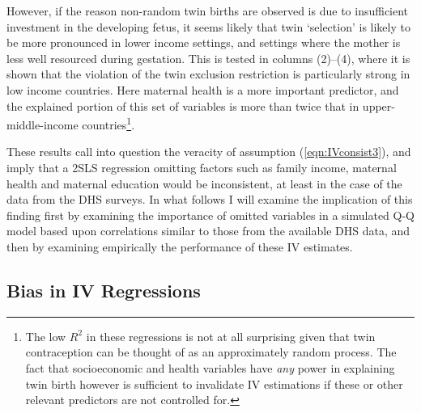 \documentclass{article}[11pt,subeqn]
\begin{document}
\begin{spacing}{1.5}
However, if the reason non-random twin births are observed is due to insufficient investment in the developing fetus, it seems likely that
 twin `selection' is likely to be more pronounced in lower income settings, and settings where the mother is less well resourced during gestation.  
This is tested in columns (2)--(4), where it is shown that the violation of the twin exclusion restriction is particularly
strong in low income countries.  Here maternal health is a more important predictor, and the explained portion of this set of variables is more than
twice that in upper-middle-income countries\footnote{The low $R^2$ in these regressions is not at all surprising given that twin contraception
can be thought of as an approximately random process.  The fact that socioeconomic and health variables have \emph{any} power in explaining
twin birth however is sufficient to invalidate IV estimations if these or other relevant predictors are not controlled for.}.

These results call into question the veracity of assumption (\ref{eqn:IVconsist3}), and imply that a 2SLS regression omitting factors such as family
income, maternal health and maternal education would be inconsistent, at least in the case of the data from the DHS surveys.  In what follows
I will examine the implication of this finding first by examining the importance of omitted variables in a simulated Q-Q model based upon
correlations similar to those from the available DHS data, and then by examining empirically the performance of these IV estimates.  
\subsection{Bias in IV Regressions}
\label{scn:bias}

\end{spacing}
\end{document}
